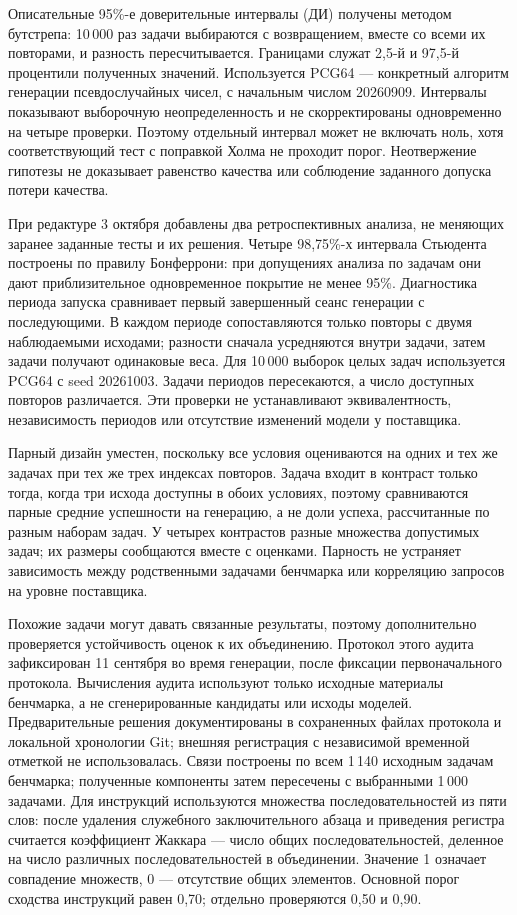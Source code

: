 Описательные 95\%-е доверительные интервалы (ДИ) получены методом бутстрепа: 10\,000 раз задачи выбираются с возвращением, вместе со всеми их повторами, и разность пересчитывается. Границами служат 2,5-й и 97,5-й процентили полученных значений. Используется PCG64 --- конкретный алгоритм генерации псевдослучайных чисел, с начальным числом 20260909. Интервалы показывают выборочную неопределенность и не скорректированы одновременно на четыре проверки. Поэтому отдельный интервал может не включать ноль, хотя соответствующий тест с поправкой Холма не проходит порог. Неотвержение гипотезы не доказывает равенство качества или соблюдение заданного допуска потери качества.

При редактуре 3 октября добавлены два ретроспективных анализа, не меняющих заранее заданные тесты и их решения. Четыре 98,75\%-х интервала Стьюдента построены по правилу Бонферрони: при допущениях анализа по задачам они дают приблизительное одновременное покрытие не менее 95\%. Диагностика периода запуска сравнивает первый завершенный сеанс генерации с последующими. В каждом периоде сопоставляются только повторы с двумя наблюдаемыми исходами; разности сначала усредняются внутри задачи, затем задачи получают одинаковые веса. Для 10\,000 выборок целых задач используется PCG64 с seed 20261003. Задачи периодов пересекаются, а число доступных повторов различается. Эти проверки не устанавливают эквивалентность, независимость периодов или отсутствие изменений модели у поставщика.

Парный дизайн уместен, поскольку все условия оцениваются на одних и тех же задачах при тех же трех индексах повторов. Задача входит в контраст только тогда, когда три исхода доступны в обоих условиях, поэтому сравниваются парные средние успешности на генерацию, а не доли успеха, рассчитанные по разным наборам задач. У четырех контрастов разные множества допустимых задач; их размеры сообщаются вместе с оценками. Парность не устраняет зависимость между родственными задачами бенчмарка или корреляцию запросов на уровне поставщика.

Похожие задачи могут давать связанные результаты, поэтому дополнительно проверяется устойчивость оценок к их объединению. Протокол этого аудита зафиксирован 11 сентября во время генерации, после фиксации первоначального протокола. Вычисления аудита используют только исходные материалы бенчмарка, а не сгенерированные кандидаты или исходы моделей. Предварительные решения документированы в сохраненных файлах протокола и локальной хронологии Git; внешняя регистрация с независимой временной отметкой не использовалась. Связи построены по всем 1\,140 исходным задачам бенчмарка; полученные компоненты затем пересечены с выбранными 1\,000 задачами. Для инструкций используются множества последовательностей из пяти слов: после удаления служебного заключительного абзаца и приведения регистра считается коэффициент Жаккара --- число общих последовательностей, деленное на число различных последовательностей в объединении. Значение 1 означает совпадение множеств, 0 --- отсутствие общих элементов. Основной порог сходства инструкций равен 0,70; отдельно проверяются 0,50 и 0,90.

